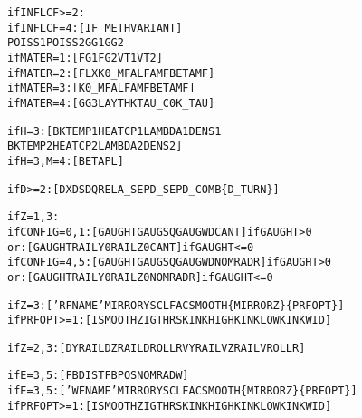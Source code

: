 \documentclass[12pt]{report}
\renewcommand{\magenta}[1]{}
\begin{document}
\begin{alltt}
% Information needed for influence coefficients,
% particularly the material parameters (section \ref{sec:matcns}):

if INFLCF>=2:
      if INFLCF=4: [ IF\_METH  VARIANT               ]
                     POISS1  POISS2  GG1     GG2
\magenta{      if BOUND =1: [ FLXZ                           ]
}      if MATER =1: [ FG1     FG2       VT1     VT2  ]
      if MATER =2: [ FLX     K0\_MF   ALFAMF  BETAMF ]
      if MATER =3: [         K0\_MF   ALFAMF  BETAMF ]
      if MATER =4: [ GG3     LAYTHK  TAU\_C0  K\_TAU  ]

% Material parameters for temperature calculation (section \ref{sec:matcns}):

if H=3:      [ BKTEMP1  HEATCP1  LAMBDA1  DENS1           
               BKTEMP2  HEATCP2  LAMBDA2  DENS2          ]
if H=3, M=4: [ BETAPL                                    ]

% Information needed for the grid discretization (section \ref{sec:wr_potcon}):

if D>=2:     [ DX    DS   DQREL   A\_SEP   D\_SEP   D\_COMB  \{D\_TURN\} ]

% Information on the track geometry (section \ref{sec:track_geom}) \& rail profile (section \ref{sec:profiles}):

if Z=1,3:
      if CONFIG=0,1:  [  GAUGHT    GAUGSQ   GAUGWD   CANT     ]  if GAUGHT >  0
                 or:  [  GAUGHT    RAILY0   RAILZ0   CANT     ]  if GAUGHT <= 0
      if CONFIG=4,5:  [  GAUGHT    GAUGSQ   GAUGWD   NOMRADR  ]  if GAUGHT >  0
                 or:  [  GAUGHT    RAILY0   RAILZ0   NOMRADR  ]  if GAUGHT <= 0

if Z=3:        [ 'RFNAME'  MIRRORY  SCLFAC    SMOOTH  \{MIRRORZ\}  \{PRFOPT\} ]
if PRFOPT>=1:  [  ISMOOTH  ZIGTHRS  KINKHIGH  KINKLOW  KINKWID ]
\magenta{if PRFOPT>=2:  [  ERRHND   MAXOMIT  ]}
if Z=2,3:      [  DYRAIL   DZRAIL   DROLLR    VYRAIL   VZRAIL   VROLLR  ]
\magenta{if Z=2,3, F=3: [  KYRAIL   FYRAIL   KZRAIL    FZRAIL                    ]}

% Information on wheelset geometry (section \ref{sec:wheelset_geom}) \& wheel profile (section \ref{sec:profiles}):

if E=3,5:      [  FBDIST   FBPOS     NOMRADW   ] 
if E=3,5:      [ 'WFNAME'  MIRRORY   SCLFAC    SMOOTH  \{MIRRORZ\}  \{PRFOPT\} ]
if PRFOPT>=1:  [  ISMOOTH  ZIGTHRS   KINKHIGH  KINKLOW  KINKWID ]
\magenta{if PRFOPT>=2:  [  ERRHND   MAXOMIT  ]}

% Information on the wheelset state (section \ref{sec:wheelset_geom}):


\end{alltt}
\end{document}
